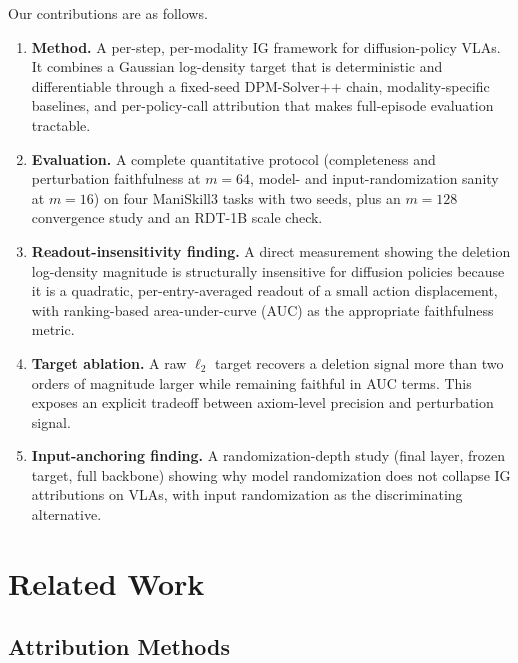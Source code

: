 \documentclass{article}
\begin{document}
Our contributions are as follows.
\begin{enumerate}
\item \textbf{Method.} A per-step, per-modality IG framework for diffusion-policy VLAs. It combines a Gaussian log-density target that is deterministic and differentiable through a fixed-seed DPM-Solver++ chain, modality-specific baselines, and per-policy-call attribution that makes full-episode evaluation tractable.
\item \textbf{Evaluation.} A complete quantitative protocol (completeness and perturbation faithfulness at $m{=}64$, model- and input-randomization sanity at $m{=}16$) on four ManiSkill3 tasks with two seeds, plus an $m{=}128$ convergence study and an RDT-1B scale check.
\item \textbf{Readout-insensitivity finding.} A direct measurement showing the deletion log-density magnitude is structurally insensitive for diffusion policies because it is a quadratic, per-entry-averaged readout of a small action displacement, with ranking-based area-under-curve (AUC) as the appropriate faithfulness metric.
\item \textbf{Target ablation.} A raw $\ell_2$ target recovers a deletion signal more than two orders of magnitude larger while remaining faithful in AUC terms. This exposes an explicit tradeoff between axiom-level precision and perturbation signal.
\item \textbf{Input-anchoring finding.} A randomization-depth study (final layer, frozen target, full backbone) showing why model randomization does not collapse IG attributions on VLAs, with input randomization as the discriminating alternative.
\end{enumerate}

\section{Related Work}

\subsection{Attribution Methods}
\end{document}
